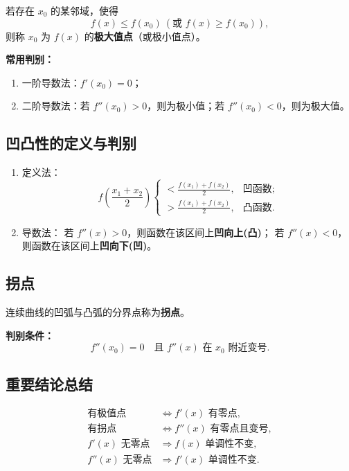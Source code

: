 若存在 $x_0$ 的某邻域，使得
\[
    f(x) \le f(x_0) \ (\text{或 } f(x) \ge f(x_0)),
\]
则称 $x_0$ 为 $f(x)$ 的\textbf{极大值点}（或极小值点）。

\textbf{常用判别：}
\begin{enumerate}
    \item 一阶导数法：$f'(x_0) = 0$；
    \item 二阶导数法：若 $f''(x_0) > 0$，则为极小值；若 $f''(x_0) < 0$，则为极大值。
\end{enumerate}

\subsection{凹凸性的定义与判别}

\begin{enumerate}
    \item 定义法：
          \[
              f\!\left(\frac{x_1+x_2}{2}\right)
              \begin{cases}
                  < \frac{f(x_1)+f(x_2)}{2}, & \text{凹函数;} \\[4pt]
                  > \frac{f(x_1)+f(x_2)}{2}, & \text{凸函数.}
              \end{cases}
          \]
    \item 导数法：
          若 $f''(x) > 0$，则函数在该区间上\textbf{凹向上(凸)}；
          若 $f''(x) < 0$，则函数在该区间上\textbf{凹向下(凹)}。
\end{enumerate}

\subsection{拐点}

连续曲线的凹弧与凸弧的分界点称为\textbf{拐点}。

\textbf{判别条件：}
\[
    f''(x_0) = 0 \quad \text{且 } f''(x) \text{ 在 } x_0 \text{ 附近变号}.
\]

\subsection{重要结论总结}

\[
    \boxed{
        \begin{aligned}
            \text{有极值点}        & \Leftrightarrow f'(x) \text{ 有零点},     \\[3pt]
            \text{有拐点}         & \Leftrightarrow f''(x) \text{ 有零点且变号}, \\[3pt]
            f'(x) \text{ 无零点}  & \Rightarrow f(x) \text{ 单调性不变},        \\[3pt]
            f''(x) \text{ 无零点} & \Rightarrow f'(x) \text{ 单调性不变.}
        \end{aligned}
    }
\]

